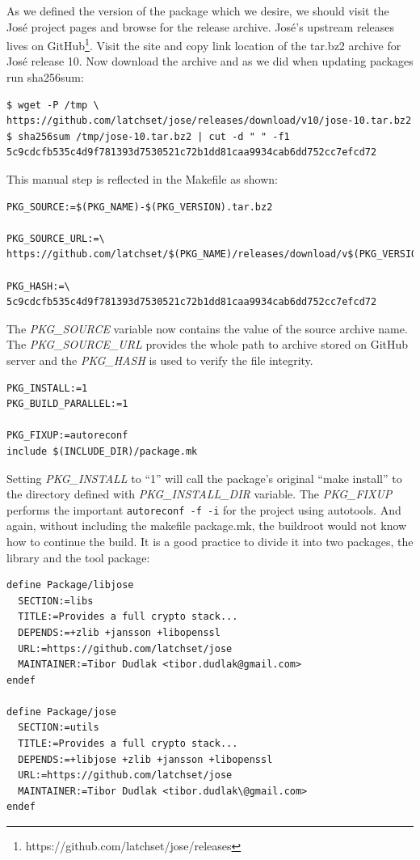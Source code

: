 As we defined the version of the package which we desire, we should visit the José project pages and browse for the release archive.
José's upstream releases lives on GitHub\footnote{https://github.com/latchset/jose/releases}.
Visit the site and copy link location of the tar.bz2 archive for José release 10.
Now download the archive and as we did when updating packages run sha256sum:
\begin{lstlisting}[columns=fixed,basicstyle=\ttfamily\footnotesize,tabsize=4,backgroundcolor=\color{yellow!10}]
$ wget -P /tmp \
https://github.com/latchset/jose/releases/download/v10/jose-10.tar.bz2
$ sha256sum /tmp/jose-10.tar.bz2 | cut -d " " -f1
5c9cdcfb535c4d9f781393d7530521c72b1dd81caa9934cab6dd752cc7efcd72
\end{lstlisting}
This manual step is reflected in the Makefile as shown:
\begin{lstlisting}[columns=fixed,basicstyle=\ttfamily\footnotesize,tabsize=4,backgroundcolor=\color{yellow!10}]
PKG_SOURCE:=$(PKG_NAME)-$(PKG_VERSION).tar.bz2

PKG_SOURCE_URL:=\
https://github.com/latchset/$(PKG_NAME)/releases/download/v$(PKG_VERSION)/

PKG_HASH:=\
5c9cdcfb535c4d9f781393d7530521c72b1dd81caa9934cab6dd752cc7efcd72
\end{lstlisting}
The {\it PKG\_SOURCE} variable now contains the value of the source archive name.
The {\it PKG\_SOURCE\_URL} provides the whole path to archive stored on GitHub server and the {\it PKG\_HASH} is used to verify the file integrity.
\begin{lstlisting}[columns=fixed,basicstyle=\ttfamily\footnotesize,tabsize=4,backgroundcolor=\color{yellow!10}]
PKG_INSTALL:=1
PKG_BUILD_PARALLEL:=1

PKG_FIXUP:=autoreconf
include $(INCLUDE_DIR)/package.mk
\end{lstlisting}
Setting {\it PKG\_INSTALL} to “1” will call the package's original “make install” to the directory defined with {\it PKG\_INSTALL\_DIR} variable.
The {\it PKG\_FIXUP} performs the important {\tt autoreconf -f -i} for the project using autotools.
And again, without including the makefile package.mk, the buildroot would not know how to continue the build.
It is a good practice to divide it into two packages, the library and the tool package:
\begin{lstlisting}[columns=fixed,basicstyle=\ttfamily\footnotesize,tabsize=4,backgroundcolor=\color{yellow!10}]
define Package/libjose
  SECTION:=libs
  TITLE:=Provides a full crypto stack...
  DEPENDS:=+zlib +jansson +libopenssl
  URL:=https://github.com/latchset/jose
  MAINTAINER:=Tibor Dudlak <tibor.dudlak@gmail.com>
endef

define Package/jose
  SECTION:=utils
  TITLE:=Provides a full crypto stack...
  DEPENDS:=+libjose +zlib +jansson +libopenssl
  URL:=https://github.com/latchset/jose
  MAINTAINER:=Tibor Dudlak <tibor.dudlak\@gmail.com>
endef
\end{lstlisting}
